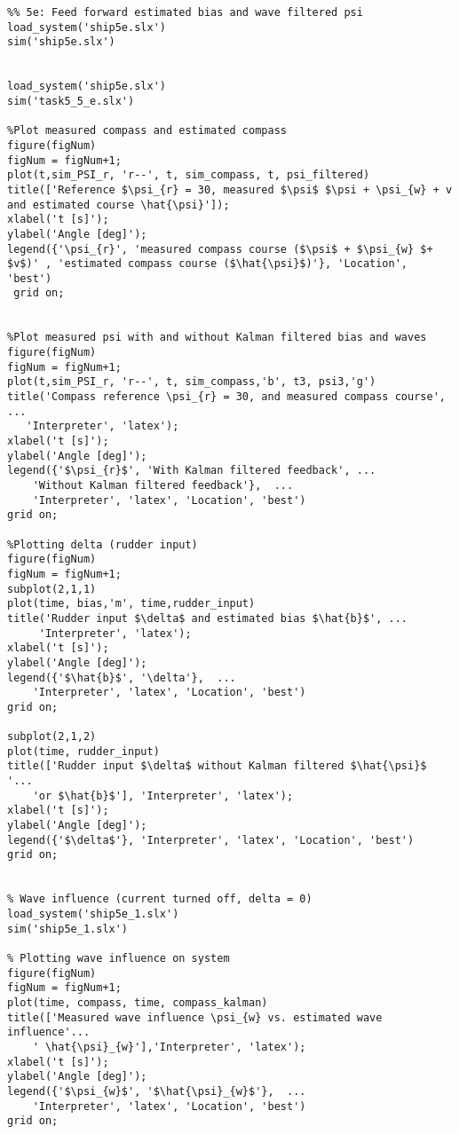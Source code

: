 \begin{lstlisting}
%% 5e: Feed forward estimated bias and wave filtered psi
load_system('ship5e.slx')
sim('ship5e.slx')


load_system('ship5e.slx')
sim('task5_5_e.slx')

%Plot measured compass and estimated compass
figure(figNum)
figNum = figNum+1;
plot(t,sim_PSI_r, 'r--', t, sim_compass, t, psi_filtered)
title(['Reference $\psi_{r} = 30, measured $\psi$ $\psi + \psi_{w} + v and estimated course \hat{\psi}']);
xlabel('t [s]');
ylabel('Angle [deg]');
legend({'\psi_{r}', 'measured compass course ($\psi$ + $\psi_{w} $+ $v$)' , 'estimated compass course ($\hat{\psi}$)'}, 'Location', 'best')
 grid on; 

 
%Plot measured psi with and without Kalman filtered bias and waves
figure(figNum)
figNum = figNum+1;
plot(t,sim_PSI_r, 'r--', t, sim_compass,'b', t3, psi3,'g')
title('Compass reference \psi_{r} = 30, and measured compass course', ...
   'Interpreter', 'latex');
xlabel('t [s]'); 
ylabel('Angle [deg]');
legend({'$\psi_{r}$', 'With Kalman filtered feedback', ...
    'Without Kalman filtered feedback'},  ...
    'Interpreter', 'latex', 'Location', 'best')
grid on; 

%Plotting delta (rudder input)
figure(figNum)
figNum = figNum+1;
subplot(2,1,1)
plot(time, bias,'m', time,rudder_input)
title('Rudder input $\delta$ and estimated bias $\hat{b}$', ...
     'Interpreter', 'latex');
xlabel('t [s]');
ylabel('Angle [deg]');
legend({'$\hat{b}$', '\delta'},  ...
    'Interpreter', 'latex', 'Location', 'best')
grid on;

subplot(2,1,2)
plot(time, rudder_input)
title(['Rudder input $\delta$ without Kalman filtered $\hat{\psi}$ '...
    'or $\hat{b}$'], 'Interpreter', 'latex');
xlabel('t [s]'); 
ylabel('Angle [deg]');
legend({'$\delta$'}, 'Interpreter', 'latex', 'Location', 'best')
grid on;


% Wave influence (current turned off, delta = 0)
load_system('ship5e_1.slx')  
sim('ship5e_1.slx')

% Plotting wave influence on system
figure(figNum)
figNum = figNum+1;
plot(time, compass, time, compass_kalman)
title(['Measured wave influence \psi_{w} vs. estimated wave influence'...
    ' \hat{\psi}_{w}'],'Interpreter', 'latex');
xlabel('t [s]'); 
ylabel('Angle [deg]');
legend({'$\psi_{w}$', '$\hat{\psi}_{w}$'},  ...
    'Interpreter', 'latex', 'Location', 'best')
grid on;
 
\end{lstlisting}

\newpage
